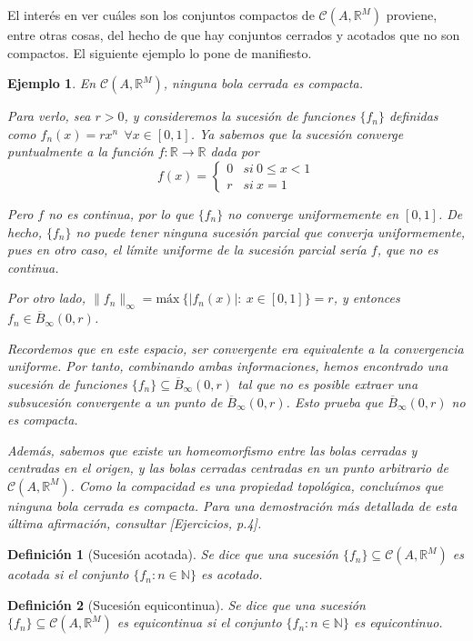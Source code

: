 \documentclass[11pt, a4paper]{article}
\newcommand{\fn}{\{f_n\}}
\theoremstyle{theorem-style}
\theoremstyle{definition-style}
\newtheorem{ndef}{Definición}[section]
\theoremstyle{remark-style}
\theoremstyle{example-style}
\newtheorem{ejemplo}{Ejemplo}[section]
\begin{document}
El interés en ver cuáles son los conjuntos compactos de $\mathcal{C}(A,\mathbb{R}^M)$ proviene, entre otras cosas, del hecho de que hay conjuntos cerrados y acotados que no son compactos. El siguiente ejemplo lo pone de manifiesto.

\begin{ejemplo} En $\mathcal{C}(A,\mathbb{R}^M)$, ninguna bola cerrada es compacta.

Para verlo, sea $r>0$, y consideremos la sucesión de funciones $\fn$ definidas como $f_n(x) = rx^n \ \ \forall x \in [0,1]$. Ya sabemos que la sucesión converge puntualmente a la función $f: \mathbb{R} \to \mathbb{R}$ dada por $$f(x) = \begin{cases} 0 & si\ 0 \le x < 1\\ r & si\ x = 1 \end{cases}$$

Pero $f$ no es continua, por lo que $\fn$ no converge uniformemente en $[0,1]$. De hecho, $\fn$ no puede tener ninguna sucesión parcial que converja uniformemente, pues en otro caso, el límite uniforme de la sucesión parcial sería $f$, que no es continua.

Por otro lado, $\|f_n\|_{\infty} = \text{máx} \ \{ |f_n(x)|:\ x \in [0,1]\} = r$, y entonces $f_n \in \overline{B}_{\infty}(0,r)$. 

Recordemos que en este espacio, ser convergente era equivalente a la convergencia uniforme. Por tanto, combinando ambas informaciones, hemos encontrado una sucesión de funciones $\fn \subseteq \overline{B}_{\infty}(0,r)$ tal que no es posible extraer una subsucesión convergente a un punto de $\overline{B}_{\infty}(0,r)$. Esto prueba que $\overline{B}_{\infty}(0,r)$ no es compacta.

Además, sabemos que existe un homeomorfismo entre las bolas cerradas y centradas en el origen, y las bolas cerradas centradas en un punto arbitrario de $\mathcal{C}(A,\mathbb{R}^M)$. Como la compacidad es una propiedad topológica, concluímos que ninguna bola cerrada es compacta. Para una demostración más detallada de esta última afirmación, consultar \textit{[Ejercicios, p.4]}.
\end{ejemplo}

\begin{ndef}[Sucesión acotada]
	Se dice que una sucesión $\fn \subseteq \mathcal{C}(A,\mathbb{R}^M)$ es acotada si el conjunto $\{ f_n: n \in \mathbb{N}\}$ es acotado. 
\end{ndef}

\begin{ndef}[Sucesión equicontinua]
	Se dice que una sucesión $\fn \subseteq \mathcal{C}(A,\mathbb{R}^M)$ es equicontinua si el conjunto $\{ f_n: n \in \mathbb{N}\}$ es equicontinuo. 
\end{ndef}
\end{document}
